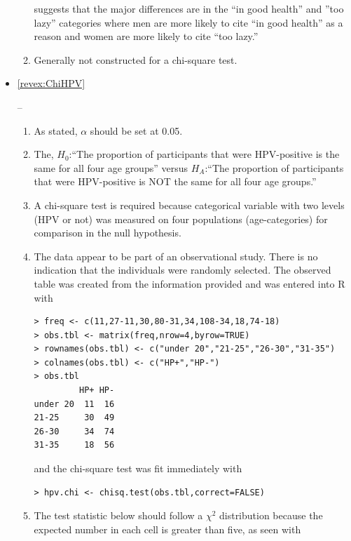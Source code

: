 \documentclass[10pt,openany]{book}\usepackage[]{graphicx}\usepackage[]{color}
\makeatletter
\newenvironment{kframe}{%
 \def\at@end@of@kframe{}%
 \ifinner\ifhmode%
  \def\at@end@of@kframe{\end{minipage}}%
  \begin{minipage}{\columnwidth}%
 \fi\fi%
 \def\FrameCommand##1{\hskip\@totalleftmargin \hskip-\fboxsep
 \colorbox{shadecolor}{##1}\hskip-\fboxsep
     \hskip-\linewidth \hskip-\@totalleftmargin \hskip\columnwidth}%
 \MakeFramed {\advance\hsize-\width
   \@totalleftmargin\z@ \linewidth\hsize
   \@setminipage}}%
 {\par\unskip\endMakeFramed%
 \at@end@of@kframe}
\newenvironment{knitrout}{}{} %
\makeatother
\begin{document}
\begin{itemize}
\begin{enumerate}
suggests that the major differences are in the ``in good health'' and ''too lazy'' categories where men are more likely to cite ``in good health'' as a reason and women are more likely to cite ``too lazy.''
      \item Generally not constructed for a chi-square test.
    \end{enumerate}
  \item \hypertarget{ans:ChiHPV}{\ref{revex:ChiHPV}} --
    \begin{enumerate}
      \item As stated, $\alpha$ should be set at 0.05.
      \item The, $H_{0}$:``The proportion of participants that were HPV-positive is the same for all four age groups'' versus $H_{A}$:``The proportion of participants that were HPV-positive is NOT the same for all four age groups.''
      \item A chi-square test is required because categorical variable with two levels (HPV or not) was measured on four populations (age-categories) for comparison in the null hypothesis.
      \item The data appear to be part of an observational study.  There is no indication that the individuals were randomly selected.  The observed table was created from the information provided and was entered into R with
\begin{knitrout}
\color{fgcolor}\begin{kframe}
\begin{verbatim}
> freq <- c(11,27-11,30,80-31,34,108-34,18,74-18)
> obs.tbl <- matrix(freq,nrow=4,byrow=TRUE)
> rownames(obs.tbl) <- c("under 20","21-25","26-30","31-35")
> colnames(obs.tbl) <- c("HP+","HP-")
> obs.tbl
         HP+ HP-
under 20  11  16
21-25     30  49
26-30     34  74
31-35     18  56
\end{verbatim}
\end{kframe}
\end{knitrout}
and the chi-square test was fit immediately with
\begin{knitrout}
\color{fgcolor}\begin{kframe}
\begin{verbatim}
> hpv.chi <- chisq.test(obs.tbl,correct=FALSE)
\end{verbatim}
\end{kframe}
\end{knitrout}
      \item The test statistic below should follow a $\chi^{2}$ distribution because the expected number in each cell is greater than five, as seen with

\end{enumerate}
\end{itemize}
\end{document}
